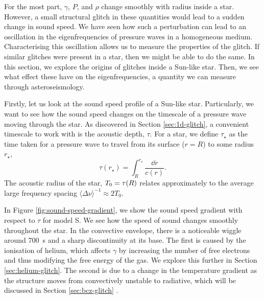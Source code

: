 For the most part, \(\gamma\), \(P\), and \(\rho\) change smoothly with radius inside a star. However, a small structural glitch in these quantities would lead to a sudden change in sound speed. We have seen how such a perturbation can lead to an oscillation in the eigenfrequencies of pressure waves in a homogeneous medium. Characterising this oscillation allows us to measure the properties of the glitch. If similar glitches were present in a star, then we might be able to do the same. In this section, we explore the origins of glitches inside a Sun-like star. Then, we see what effect these have on the eigenfrequencies, a quantity we can measure through asteroseismology.

Firstly, let us look at the sound speed profile of a Sun-like star. Particularly, we want to see how the sound speed changes on the timescale of a pressure wave moving through the star. As discovered in Section \ref{sec:1d-glitch}, a convenient timescale to work with is the acoustic depth, \(\tau\). For a star, we define \(\tau_\star\) as the time taken for a pressure wave to travel from its surface (\(r=R\)) to some radius \(r_\star\),
%
\begin{equation}
    \tau(r_\star) = \int_R^{r_\star} \frac{\dd r}{c(r)}.
\end{equation}
%
The acoustic radius of the star, \({T_0} = \tau(R)\) relates approximately to the average large frequency spacing \(\langle\Delta\nu\rangle^{-1} \approx 2T_0\).

In Figure \ref{fig:sound-speed-gradient}, we show the sound speed gradient with respect to \(\tau\) for model S. We see how the speed of sound changes smoothly throughout the star. In the convective envelope, there is a noticeable wiggle around \SI{700}{\second} and a sharp discontinuity at its base. The first is caused by the ionisation of helium, which affects \(\gamma\) by increasing the number of free electrons and thus modifying the free energy of the gas. We explore this further in Section \ref{sec:helium-glitch}. The second is due to a change in the temperature gradient as the structure moves from convectively unstable to radiative, which will be discussed in Section \ref{sec:bcz-glitch} .

